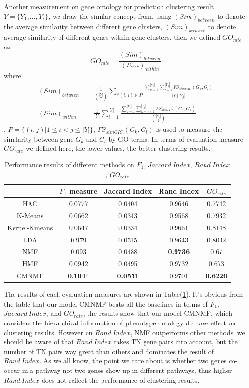 \documentclass{bmcart}
\begin{document}
Another measurement on gene ontology for prediction clustering result $Y=\{Y_1,...,Y_s\}$, we draw the similar concept from\cite{Wei2006}, using  $(Sim)_{between}$ to denote the average similarity between different gene clusters, $(Sim)_{between}$ to denote average similarity of different genes within gene clusters. then we defined $GO_{rate}$ as:
$$
GO_{rate} = \frac{(Sim)_{between}}{(Sim)_{within}}
$$
where
\begin{equation}\label{}\nonumber
\begin{split}
(Sim)_{between}&=\frac{1}{{|Y|\choose 2}}\sum_{\forall(i,j)\in P}
\frac{\sum_{k=1}^{|Y_i|}\sum_{l=1}^{|Y_j|}FS_{simGIC}(G_k,G_l)}{|Y_i||Y_j|}\\
(Sim)_{within}&=\frac{1}{|Y|}\sum_{i=1}^{|Y|}
\frac{\sum_{j=1}^{|Y_i|}\sum_{k=j+1}^{|Y_i|}FS_{simGIC}(G_j,G_k)}{{|Y_i|\choose 2}}
\end{split}
\end{equation}
,
$P=\{(i,j)|1\leq i< j\leq|Y|\}$, $FS_{simGIC}(G_k,G_l)$ \cite{Teng2013} is used to measure the similarity between gene $G_k$ and $G_l$ by GO terms. In terms of evaluation measure $GO_{rate}$ we defined here, the lower values, the better clustering results.
\begin{table}[!t]
\centering
\caption{Performance results of different methods on $F_1$, $Jaccard\ Index$, $Rand\ Index$, $GO_{rate}$}\label{tab:measurements}
\begin{tabular}{|c||c|c|c|c|}
\hline
&$F_1$ measure &Jaccard Index& Rand Index&$GO_{rate}$\\
\hline
\hline
HAC&0.0777&0.0404&0.9646&0.7742\\
\hline
K-Means&0.0662  & 0.0343&0.9568& 0.7932\\
\hline
Kernel-Kmeans&0.0647&0.0334&0.9661&0.8148\\
\hline
LDA&0.979&0.0515&0.9643&0.8032\\
\hline
NMF&0.093&0.0488&\textbf{0.9736}&0.67\\
\hline
HMF&0.0942&0.0495&0.9732&0.673\\
\hline
CMNMF&\textbf{0.1044}& \textbf{0.0551}&{0.9701}& \textbf{0.6226}\\
\hline
\end{tabular}
\end{table}
The results of each evaluation measures are shown in Table(\ref{tab:measurements}).
It's obvious from the table that our model CMNMF beats all the baselines in terms of $F_1$, $Jaccard\ Index$, and $GO_{rate}$, the results show that our model CMNMF, which considers the hierarchical information of phenotype ontology do have effect on clustering results. However on $Rand\ Index$, NMF outperforms other methods, we should be aware of that $Rand\ Index$ takes TN gene pairs into account, but the number of TN pairs way great than others and dominates the result of $Rand\ Index$. As we all know, the point we care about is whether two genes co-occur in a pathway not two genes show up in different pathways, thus higher $Rand\ Index$ does not reflect the performance of clustering results.
\end{document}
